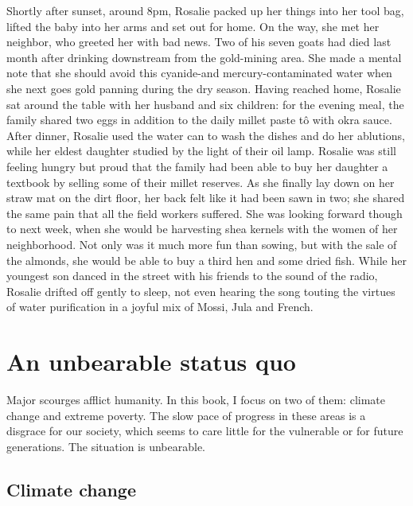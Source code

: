 \documentclass[a5paper,english,openany]{memoir}
\begin{document}
 Shortly after sunset, around 8pm, Rosalie packed up her things into her tool bag, lifted the baby into her arms and set out for home. On the way, she met her neighbor, %
 who greeted her with bad news. Two of his seven goats had died last month after drinking downstream from the gold-mining area. She made a mental note that she should avoid this cyanide-and mercury-contaminated water when she next goes gold panning during the dry season. Having reached home, Rosalie sat around the table with her husband and six children: for the evening meal, the family shared two eggs in addition to the daily millet paste tô with okra sauce. After dinner, Rosalie used the water can to wash the dishes and do her ablutions, while her eldest daughter studied by the light of their oil lamp. Rosalie was still feeling hungry but proud that the family had been able to buy her daughter a textbook by selling some of their millet reserves. As she finally lay down on her straw mat on the dirt floor, her back felt like it had been sawn in two; she shared the same pain that all the field workers suffered. She was looking forward though to next week, when she would be harvesting shea kernels with the women of her neighborhood. %
 Not only was it much more fun than sowing, but with the sale of the almonds, she would be able to buy a third hen and some dried fish. While her youngest son danced in the street with his friends to the sound of the radio, Rosalie drifted off gently to sleep, not even hearing the song touting the virtues of water purification in a joyful mix of Mossi, Jula and French.

\chapter{An unbearable status quo\label{ch:statu_quo}}

Major scourges afflict humanity. In this book, I %
focus on two of them: climate change and extreme poverty. The slow pace of progress in these areas is a disgrace for our society, which seems to care little for the vulnerable or for future generations. The situation is unbearable.

\section*{Climate change}
\end{document}
